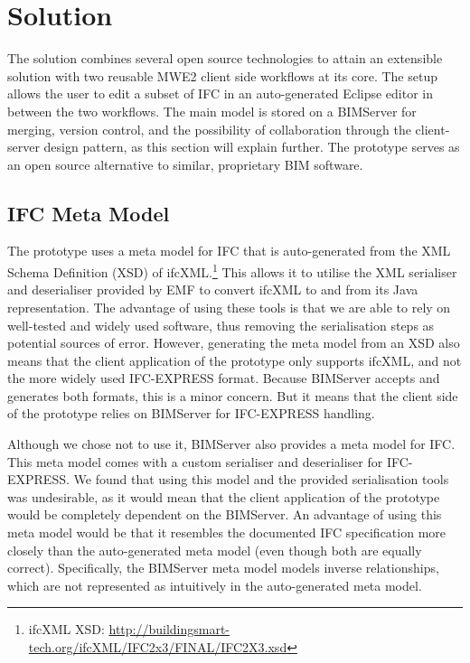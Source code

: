 \section{Solution}
\label{sec:solution}
The solution combines several open source technologies to attain an extensible solution with two reusable MWE2 client side workflows at its core. The setup allows the user to edit a subset of IFC in an auto-generated Eclipse editor in between the two workflows. The main model is stored on a BIMServer for merging, version control, and the possibility of collaboration through the client-server design pattern, as this section will explain further. The prototype serves as an open source alternative to similar, proprietary BIM software.

\subsection{IFC Meta Model}
\label{subsec:ifc_meta_model}
The prototype uses a meta model for IFC that is auto-generated from the XML Schema Definition (XSD) of ifcXML.\footnote{ifcXML XSD: \url{http://buildingsmart-tech.org/ifcXML/IFC2x3/FINAL/IFC2X3.xsd}} This allows it to utilise the XML serialiser and deserialiser provided by EMF to convert ifcXML to and from its Java representation. The advantage of using these tools is that we are able to rely on well-tested and widely used software, thus removing the serialisation steps as potential sources of error. However, generating the meta model from an XSD also means that the client application of the prototype only supports ifcXML, and not  the more widely used IFC-EXPRESS format. Because BIMServer accepts and generates both formats, this is a minor concern. But it means that the client side of the prototype relies on BIMServer for IFC-EXPRESS handling.

Although we chose not to use it, BIMServer also provides a meta model for IFC. This meta model comes with a custom serialiser and deserialiser for IFC-EXPRESS. We found that using this model and the provided serialisation tools was undesirable, as it would mean that the client application of the prototype would be completely dependent on the BIMServer. An advantage of using this meta model would be that it resembles the documented IFC specification more closely than the auto-generated meta model (even though both are equally correct). Specifically, the BIMServer meta model models inverse relationships, which are not represented as intuitively in the auto-generated meta model.

